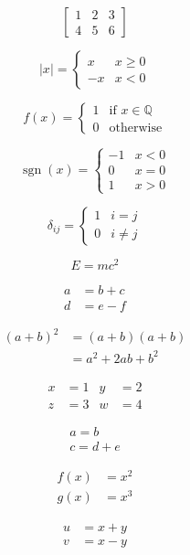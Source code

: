 \documentclass{article}
\begin{document}
\newpage
\[
\left[\begin{array}{cc|c} 1 & 2 & 3 \\ 4 & 5 & 6 \end{array}\right]
\]
\par
\newpage
\[
|x| = \begin{cases} x & x \ge 0 \\ -x & x < 0 \end{cases}
\]
\par
\newpage
\[
f(x) = \begin{cases} 1 & \text{if } x \in \mathbb{Q} \\ 0 & \text{otherwise} \end{cases}
\]
\par
\newpage
\[
\operatorname{sgn}(x) = \begin{cases} -1 & x < 0 \\ 0 & x = 0 \\ 1 & x > 0 \end{cases}
\]
\par
\newpage
\[
\delta_{ij} = \begin{cases} 1 & i = j \\ 0 & i \ne j \end{cases}
\]
\par
\newpage
\[
E = mc^2
\]
\par
\newpage
\begin{align*}
a &= b + c \\ d &= e - f
\end{align*}
\par
\newpage
\begin{align*}
(a+b)^2 &= (a+b)(a+b) \\ &= a^2 + 2ab + b^2
\end{align*}
\par
\newpage
\begin{align*}
x &= 1 & y &= 2 \\ z &= 3 & w &= 4
\end{align*}
\par
\newpage
\begin{gather*}
a = b \\ c = d + e
\end{gather*}
\par
\newpage
\begin{align*}
f(x) &= x^2 \\ g(x) &= x^3
\end{align*}
\par
\newpage
\[
\begin{aligned} u &= x + y \\ v &= x - y \end{aligned}
\]
\end{document}

